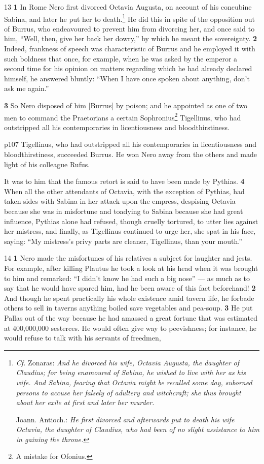 13
\textbf{1} In Rome Nero first divorced Octavia Augusta, on account of his concubine Sabina, and later he put her to death.\texthebrew{⁠}\footnote{\emph{Cf.} Zonaras: \emph{And he divorced his wife, Octavia Augusta, the daughter of Claudius; for being enamoured of Sabina, he wished to live with her as his wife. And Sabina, fearing that Octavia might be recalled some day, suborned persons to accuse her falsely of adultery and witchcraft; she thus brought about her exile at first and later her murder.}

Joann. Antioch.: \emph{He first divorced and afterwards put to death his wife Octavia, the daughter of Claudius, who had been of no slight assistance to him in gaining the throne.}

} He did this in spite of the opposition out of Burrus, who endeavoured to prevent him from divorcing her, and once said to him, ``Well, then, give her back her dowry,'' by which he meant the sovereignty. \textbf{2} Indeed, frankness of speech was characteristic of Burrus and he employed it with such boldness that once, for example, when he was asked by the emperor a second time for his opinion on matters regarding which he had already declared himself, he answered bluntly: ``When I have once spoken about anything, don't ask me again.''

\textbf{3} So Nero disposed of him [Burrus] by poison; and he appointed as one of two men to command the Praetorians a certain Sophronius\texthebrew{⁠}\footnote{A mistake for Ofonius.

} Tigellinus, who had outstripped all his contemporaries in licentiousness and bloodthirstiness.

p107
Tigellinus, who had outstripped all his contemporaries in licentiousness and bloodthirstiness, succeeded Burrus. He won Nero away from the others and made light of his colleague Rufus.

It was to him that the famous retort is said to have been made by Pythias. \textbf{4} When all the other attendants of Octavia, with the exception of Pythias, had taken sides with Sabina in her attack upon the empress, despising Octavia because she was in misfortune and toadying to Sabina because she had great influence, Pythias alone had refused, though cruelly tortured, to utter lies against her mistress, and finally, as Tigellinus continued to urge her, she spat in his face, saying: ``My mistress's privy parts are cleaner, Tigellinus, than your mouth.''

14
\textbf{1} Nero made the misfortunes of his relatives a subject for laughter and jests. For example, after killing Plautus he took a look at his head when it was brought to him and remarked: ``I didn't know he had such a big nose'' \texthebrew{—} as much as to say that he would have spared him, had he been aware of this fact beforehand! \textbf{2} And though he spent practically his whole existence amid tavern life, he forbade others to sell in taverns anything boiled save vegetables and pea-soup. \textbf{3} He put Pallas out of the way because he had amassed a great fortune that was estimated at 400,000,000 sesterces. He would often give way to peevishness; for instance, he would refuse to talk with his servants of freedmen,

